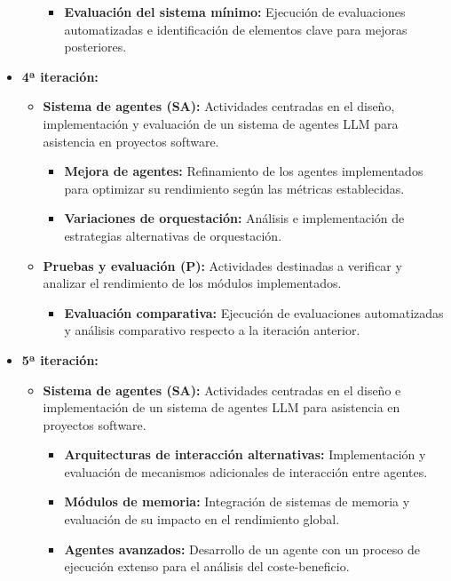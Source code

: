 \begin{itemize}
\begin{itemize}
\begin{itemize}
          \item\textbf{Evaluación del sistema mínimo: } Ejecución de evaluaciones automatizadas e identificación de elementos clave para mejoras posteriores.
        \end{itemize}
    \end{itemize}
  \item\textbf{4ª iteración:}
    \begin{itemize}
      \item\textbf{Sistema de agentes (SA):} Actividades centradas en el diseño, implementación y evaluación de un sistema de agentes LLM para asistencia en proyectos software.
        \begin{itemize}
          \item\textbf{Mejora de agentes:} Refinamiento de los agentes implementados para optimizar su rendimiento según las métricas establecidas.
          \item\textbf{Variaciones de orquestación:} Análisis e implementación de estrategias alternativas de orquestación. 
        \end{itemize}
      \item\textbf{Pruebas y evaluación (P):} Actividades destinadas a verificar y analizar el rendimiento de los módulos implementados.
        \begin{itemize}
          \item\textbf{Evaluación comparativa:} Ejecución de evaluaciones automatizadas y análisis comparativo respecto a la iteración anterior.
        \end{itemize}
    \end{itemize}
  \item\textbf{5ª iteración:}
    \begin{itemize}
      \item\textbf{Sistema de agentes (SA):} Actividades centradas en el diseño e implementación de un sistema de agentes LLM para asistencia en proyectos software.
        \begin{itemize}
          \item\textbf{Arquitecturas de interacción alternativas:} Implementación y evaluación de mecanismos adicionales de interacción entre agentes.
          \item\textbf{Módulos de memoria:} Integración de sistemas de memoria y evaluación de su impacto en el rendimiento global. 
          \item\textbf{Agentes avanzados:} Desarrollo de un agente con un proceso de ejecución extenso para el análisis del coste-beneficio.

\end{itemize}
\end{itemize}
\end{itemize}
